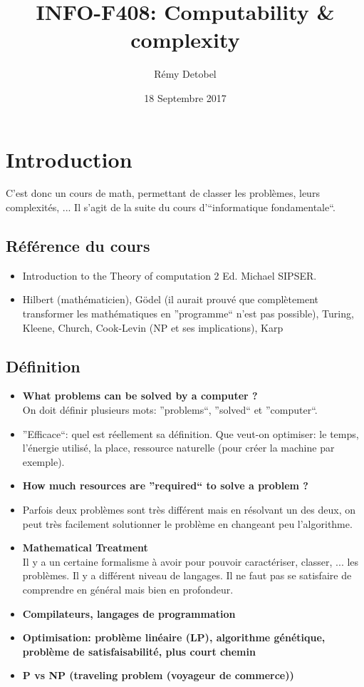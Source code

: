 \documentclass[a4paper,12pt]{article}
\title{INFO-F408: Computability \& complexity}
\author{Rémy Detobel}
\date{18 Septembre 2017}
\begin{document}
\maketitle
\newpage

\section{Introduction}
  C'est donc un cours de math, permettant de classer les problèmes, leurs complexités, ... Il s'agit de la suite du cours d'``informatique fondamentale``.

  \subsection{Référence du cours}
    \begin{itemize}
      \item Introduction to the Theory of computation 2 Ed.  Michael SIPSER.
      \item Hilbert (mathématicien), Gödel (il aurait prouvé que complètement transformer les mathématiques en ''programme`` n'est pas possible), Turing, Kleene, Church, Cook-Levin (NP et ses implications), Karp
    \end{itemize}

  \subsection{Définition}
    \begin{itemize}
      \item \textbf{What problems can be solved by a computer ?}\\
	  On doit définir plusieurs mots: ''problems``, ''solved`` et ''computer``.
      \item ''Efficace``: quel est réellement sa définition.  Que veut-on optimiser: le temps, l'énergie utilisé, la place, ressource naturelle (pour créer la machine par exemple).
      \item \textbf{How much resources are ''required`` to solve a problem ?}
      \item Parfois deux problèmes sont très différent mais en résolvant un des deux, on peut très facilement solutionner le problème en changeant peu l'algorithme.
      \item \textbf{Mathematical Treatment}\\
	Il y a un certaine formalisme à avoir pour pouvoir caractériser, classer, ... les problèmes.  Il y a différent niveau de langages.  Il ne faut pas se satisfaire de comprendre en général mais bien en profondeur.
      \item \textbf{Compilateurs, langages de programmation}
      \item \textbf{Optimisation: problème linéaire (LP), algorithme génétique, problème de satisfaisabilité, plus court chemin}
      \item \textbf{P vs NP (traveling problem (voyageur de commerce))}
    \end{itemize}
\end{document}
